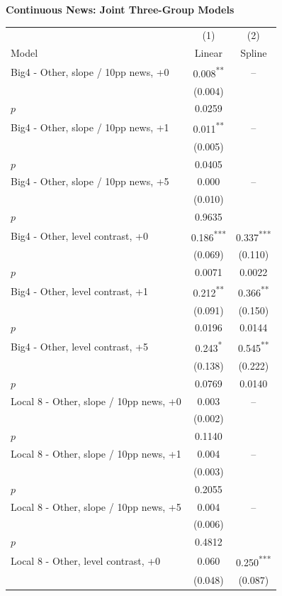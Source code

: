 \documentclass[10pt]{article}
\newcommand{\sym}[1]{\textsuperscript{#1}}
\begin{document}
\begin{minipage}{18.00cm}
\fontsize{10}{12}\selectfont
\setlength{\tabcolsep}{4pt}\renewcommand{\arraystretch}{1.08}
{\large\bfseries Continuous News: Joint Three-Group Models}\par\medskip
\begin{tabular*}{\linewidth}{@{\extracolsep{\fill}}lcc@{}}
\toprule
 & (1) & (2) \\
Model & Linear & Spline \\
\midrule
Big4 - Other, slope / 10pp news, +0 & 0.008\sym{**} & -- \\
 & (0.004) &  \\
$p$ & 0.0259 &  \\
Big4 - Other, slope / 10pp news, +1 & 0.011\sym{**} & -- \\
 & (0.005) &  \\
$p$ & 0.0405 &  \\
Big4 - Other, slope / 10pp news, +5 & 0.000 & -- \\
 & (0.010) &  \\
$p$ & 0.9635 &  \\
Big4 - Other, level contrast, +0 & 0.186\sym{***} & 0.337\sym{***} \\
 & (0.069) & (0.110) \\
$p$ & 0.0071 & 0.0022 \\
Big4 - Other, level contrast, +1 & 0.212\sym{**} & 0.366\sym{**} \\
 & (0.091) & (0.150) \\
$p$ & 0.0196 & 0.0144 \\
Big4 - Other, level contrast, +5 & 0.243\sym{*} & 0.545\sym{**} \\
 & (0.138) & (0.222) \\
$p$ & 0.0769 & 0.0140 \\
Local 8 - Other, slope / 10pp news, +0 & 0.003 & -- \\
 & (0.002) &  \\
$p$ & 0.1140 &  \\
Local 8 - Other, slope / 10pp news, +1 & 0.004 & -- \\
 & (0.003) &  \\
$p$ & 0.2055 &  \\
Local 8 - Other, slope / 10pp news, +5 & 0.004 & -- \\
 & (0.006) &  \\
$p$ & 0.4812 &  \\
Local 8 - Other, level contrast, +0 & 0.060 & 0.250\sym{***} \\
 & (0.048) & (0.087) \\

\end{tabular*}
\end{minipage}
\end{document}

